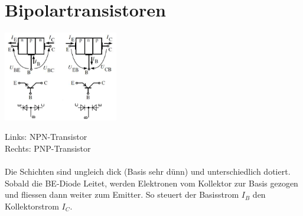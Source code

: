 \newpage
\section{Bipolartransistoren}
	\begin{minipage}[c]{6cm}
		\includegraphics[width=5cm]{images/bipolarTransistor-Aufbau}
	\end{minipage}
	\begin{minipage}[c]{12cm}
		Links: NPN-Transistor \\
		Rechts: PNP-Transistor \\
		\\
		Die Schichten sind ungleich dick (Basis sehr dünn) und unterschiedlich dotiert.
		Sobald die BE-Diode Leitet, werden Elektronen vom Kollektor zur Basis gezogen und
		fliessen dann weiter zum Emitter. So steuert der Basisstrom $I_B$ den 
		Kollektorstrom $I_C$. \\
	\end{minipage} \\
	
